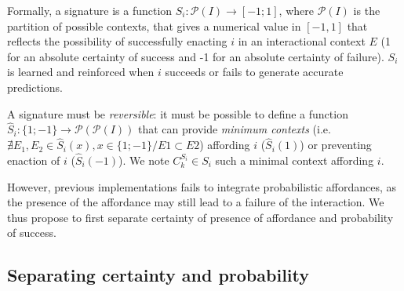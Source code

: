 \documentclass[conference]{IEEEtran}
\begin{document}
Formally, a signature is a function $S_i : \mathcal{P}(I) \rightarrow [-1;1]$, where $\mathcal{P}(I)$ is the partition of possible contexts, that gives a numerical value in $[-1, 1]$ that reflects the possibility of successfully enacting $i$ in an interactional context $E$ (1 for an absolute certainty of success and -1 for an absolute certainty of failure). $S_i$ is learned and reinforced when $i$ succeeds or fails to generate accurate predictions. %

A signature must be \textit{reversible}: it must be possible to define a function $\hat{S}_i : \{1;-1\} \rightarrow \mathcal{P}(\mathcal{P}(I))$ that can provide \textit{minimum contexts} (i.e. $\nexists E_1,\!E_2\!\in\!\hat{S}_i(x), x\!\in\!\{1;-1\} / E1\!\subset\!E2$) affording $i$ ($\hat{S}_i(1)$) or preventing enaction of $i$ ($\hat{S}_i(-1)$). We note $C_k^{S_i} \in S_i$ such a minimal context affording $i$.

However, previous implementations fails to integrate probabilistic affordances, as the presence of the affordance may still lead to a failure of the interaction. We thus propose to first separate certainty of presence of affordance and probability of success.



\subsection{Separating certainty and probability}\label{AA}
\end{document}
